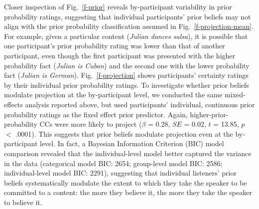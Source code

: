 \documentclass[11pt,fleqn]{article}
\newcommand{\figref}[1]{Fig.~\ref{#1}}
\newcommand{\6}{\mbox{$[\hspace*{-.6mm}[$}}
\newcommand{\9}{\mbox{$]\hspace*{-.6mm}]$}}
\begin{document}
Closer inspection of  \figref{f-prior} reveals by-participant variability in prior probability ratings, suggesting that individual participants' prior beliefs may not align with the prior probability classification assumed in  \figref{f-projection-mean}. For example, given a particular content ({\em Julian dances salsa}), it is possible that one participant's prior probability rating was lower than that of another participant, even though the first participant was presented with the higher probability fact ({\em Julian is Cuban}) and the second one with the lower probability fact ({\em Julian is German}). \figref{f-projection} shows participants' certainty ratings by their individual prior probability ratings. %
To investigate whether prior beliefs modulate projection at the by-participant level,  we conducted the same mixed-effects analysis reported above, but used participants' individual, continuous prior probability ratings as the fixed effect prior predictor. Again, higher-prior-probability CCs were more likely to project ($\beta$ = 0.28, $SE$ = 0.02, $t$ = 13.85, $p$ $<$ .0001). This  suggests that prior beliefs modulate projection even at the by-participant level. In fact, a Bayesian Information Criterion (BIC) model comparison  revealed that the individual-level model better captured the variance in the data (categorical model BIC: 2654; group-level model BIC: 2586; individual-level model BIC: 2291), suggesting that individual listeners' prior beliefs systematically modulate the extent to which they take the speaker to be committed to a content: the more they believe it, the more they take the speaker to believe it.
\end{document}
